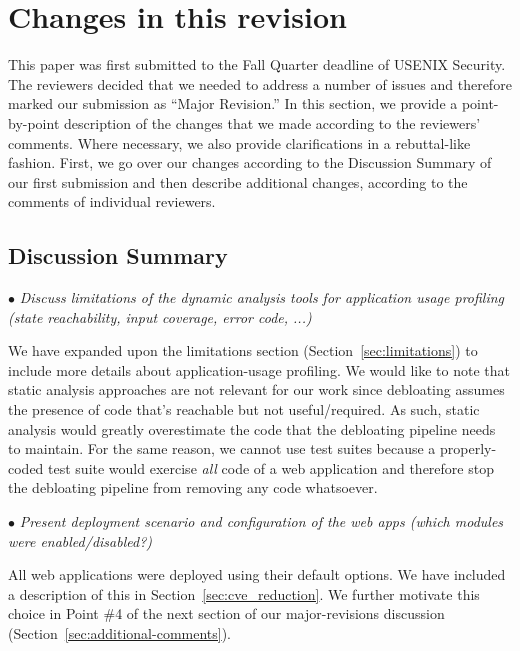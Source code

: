 \newpage
\section{Changes in this revision}

This paper was first submitted to the Fall Quarter deadline of USENIX Security. The reviewers decided that we needed to address a number of issues and therefore marked our submission as ``Major Revision.'' In this section, we provide a point-by-point description of the changes that we made according to the reviewers' comments. Where necessary, we also provide clarifications in a rebuttal-like fashion. First, we go over our changes according to the Discussion Summary of our first submission and then describe additional changes, according to the comments of individual reviewers.

\subsection{Discussion Summary}

\noindent $\bullet$ \textit{Discuss limitations of the dynamic analysis tools for application usage profiling (state reachability, input coverage, error code, ...)}
\vspace{0.5ex}

\noindent We have expanded upon the limitations section (Section~\ref{sec:limitations}) to include more details about application-usage profiling. We would like to note that static analysis approaches are not relevant for our work since debloating assumes the presence of code that's reachable but not useful/required. As such, static analysis would greatly overestimate the code that the debloating pipeline needs to maintain. For the same reason, we cannot use test suites because a properly-coded test suite would exercise \emph{all} code of a web application and therefore stop the debloating pipeline from removing any code whatsoever.

\vspace{1ex}

\noindent $\bullet$ \textit{Present deployment scenario and configuration of the web apps (which modules were enabled/disabled?)}
\vspace{0.5ex}

\noindent All web applications were deployed using their default options. We have included a description of this in Section~\ref{sec:cve_reduction}. We further motivate this choice in Point \#4 of the next section of our major-revisions discussion (Section~\ref{sec:additional-comments}).


